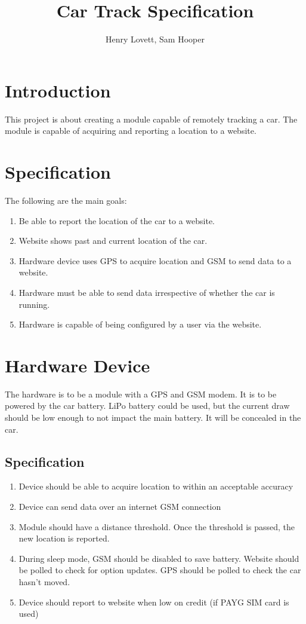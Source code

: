 \documentclass[12pt]{article}
\author{Henry Lovett, Sam Hooper}
\title{Car Track Specification}
\begin{document}
\maketitle


\section{Introduction}

This project is about creating a module capable of remotely tracking a car. 
The module is capable of acquiring and reporting a location to a website. 

\section{Specification}
The following are the main goals:

\begin{enumerate}
\item Be able to report the location of the car to a website. 
\item Website shows past and current location of the car.
\item Hardware device uses GPS to acquire location and GSM to send data to a website.
\item Hardware must be able to send data irrespective of whether the car is running.
\item Hardware is capable of being configured by a user via the website.
\end{enumerate}

\section{Hardware Device}

The hardware is to be a module with a GPS and GSM modem. 
It is to be powered by the car battery. 
LiPo battery could be used, but the current draw should be low enough to not impact the main battery. 
It will be concealed in the car.

\subsection{Specification}

\begin{enumerate}
\item Device should be able to acquire location to within an acceptable accuracy
\item Device can send data over an internet GSM connection
\item Module should have a distance threshold. Once the threshold is passed, the new location is reported.
\item During sleep mode, GSM should be disabled to save battery. Website should be polled to check for option updates. GPS should be polled to check the car hasn't moved.
\item Device should report to website when low on credit (if PAYG SIM card is used)
\end{enumerate}
\end{document}
